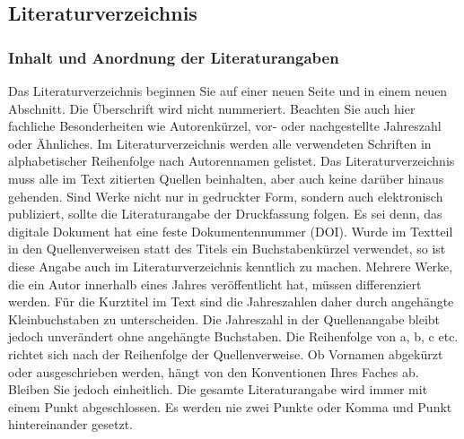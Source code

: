 \documentclass[a4paper,11pt]{article}%
\renewcommand{\\}{\vspace*{0.5\baselineskip} \newline}
\begin{document}
\subsection{Literaturverzeichnis}
\subsubsection{Inhalt und Anordnung der Literaturangaben}
Das Literaturverzeichnis beginnen Sie auf einer neuen Seite und in einem neuen Abschnitt. Die Überschrift wird nicht nummeriert. Beachten Sie auch hier fachliche Besonderheiten wie Autorenkürzel, vor- oder nachgestellte Jahreszahl oder Ähnliches. \\
Im Literaturverzeichnis werden alle verwendeten Schriften in alphabetischer Reihenfolge nach Autorennamen gelistet. Das Literaturverzeichnis muss alle im Text zitierten Quellen beinhalten, aber auch keine darüber hinaus gehenden. Sind Werke nicht nur in gedruckter Form, sondern auch elektronisch publiziert, sollte die Literaturangabe der Druckfassung folgen. Es sei denn, das digitale Dokument hat eine feste Dokumentennummer (DOI). Wurde im Textteil in den Quellenverweisen statt des Titels ein Buchstabenkürzel verwendet, so ist diese Angabe auch im Literaturverzeichnis kenntlich zu machen.\\
Mehrere Werke, die ein Autor innerhalb eines Jahres veröffentlicht hat, müssen differenziert werden. Für die Kurztitel im Text sind die Jahreszahlen daher durch angehängte Kleinbuchstaben zu unterscheiden. Die Jahreszahl in der Quellenangabe bleibt jedoch unverändert ohne angehängte Buchstaben. Die Reihenfolge von a, b, c etc. richtet sich nach der Reihenfolge der Quellenverweise. Ob Vornamen abgekürzt oder ausgeschrieben werden, hängt von den Konventionen Ihres Faches ab. Bleiben Sie jedoch einheitlich.\\
Die gesamte Literaturangabe wird immer mit einem Punkt abgeschlossen. Es werden nie zwei Punkte oder Komma und Punkt hintereinander gesetzt.
\end{document}
